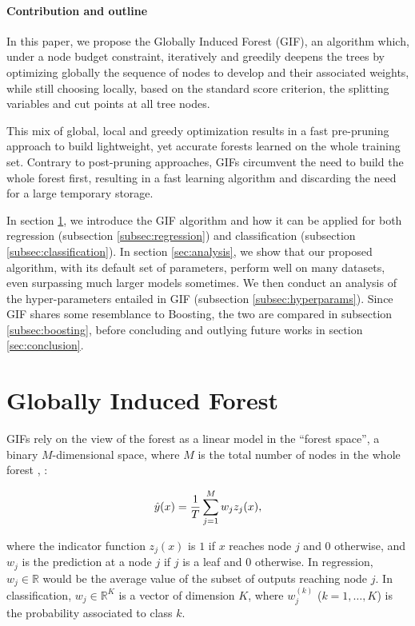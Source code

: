 \documentclass{article}
\begin{document}
\paragraph{Contribution and outline}
In this paper, we propose the Globally Induced Forest (GIF), an algorithm 
which, under a node budget constraint, iteratively and greedily deepens the 
trees by optimizing globally the sequence of nodes to develop and their 
associated weights, while still choosing locally, based on the standard score 
criterion, the splitting variables and cut points at all tree nodes. 

This mix of global, local and greedy optimization results in a fast pre-pruning 
approach to build lightweight, yet accurate forests learned on the whole 
training set. Contrary to post-pruning approaches, GIFs circumvent the need to 
build the whole forest first, resulting in a fast learning algorithm and 
discarding the need for a large temporary storage.

In section \ref{sec:gif}, we introduce the GIF algorithm and how it can be 
applied for both regression (subsection \ref{subsec:regression}) and 
classification (subsection \ref{subsec:classification}). 
In section \ref{sec:analysis}, we show that our proposed algorithm, with its 
default set of parameters, perform well on many datasets, even surpassing much 
larger models sometimes. We then conduct an analysis of the hyper-parameters 
entailed in GIF (subsection \ref{subsec:hyperparams}). Since GIF shares some 
resemblance to Boosting, the two are compared in subsection 
\ref{subsec:boosting}, before concluding and outlying future works in section 
\ref{sec:conclusion}. 


\section{Globally Induced Forest}
\label{sec:gif}

GIFs rely on the view of the forest as a linear model in the ``forest space'', 
a binary $M$-dimensional space, where $M$ is the total number of nodes in the 
whole forest \cite{l1basedcomp}, \cite{vens2011random}:

\begin{equation}\label{eq:fs}
\vspace{-1em}
\hat{y}(x) =  \frac{1}{T} \sum_{j=1}^{M} w_j z_j(x),
\end{equation}

where the indicator function $z_j(x)$ is $1$ if $x$ reaches node $j$
and $0$ otherwise, and $w_j$ is the prediction at a node $j$ if $j$ is
a leaf and $0$ otherwise. In regression, $w_j \in \mathbb{R}$ would be the 
average value of the subset of outputs reaching node $j$. In classification, 
$w_j \in \mathbb{R}^K$ is a vector of dimension $K$, where $w_j^{(k)}$ 
($k=1,\ldots,K$) is the probability associated to class $k$.
\end{document}
